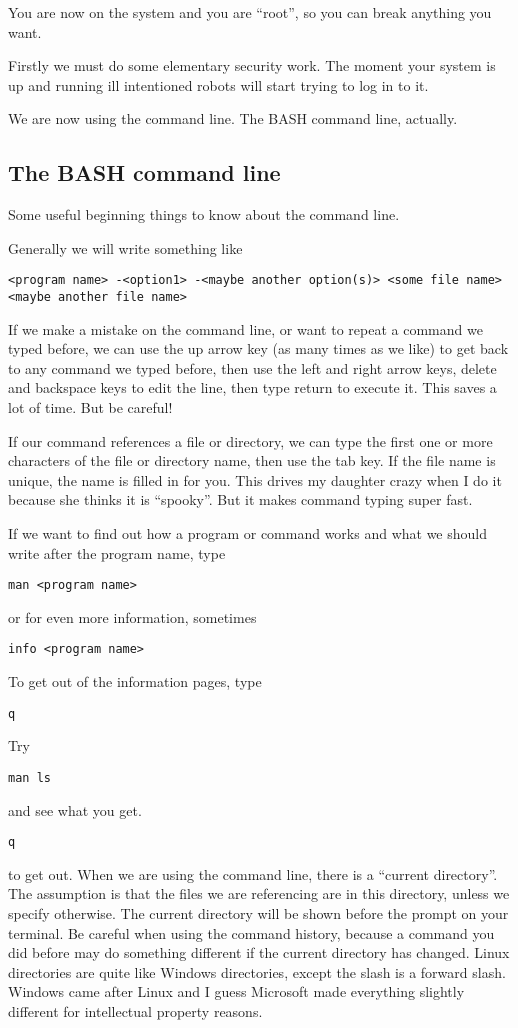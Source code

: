 \documentclass[12pt,a4paper]{article}
\begin{document}
You are now on the system and you are ``root'', so you can break anything you want.  

Firstly we must do some elementary security work. The moment your system is up and running ill intentioned robots will start trying to log in to it. 

We are now using the command line. The BASH command line, actually.

\subsection*{The BASH command line}
Some useful beginning things to know about the command line.

Generally we will write something like 
\begin{verbatim}
<program name> -<option1> -<maybe another option(s)> <some file name>  <maybe another file name>
\end{verbatim}


If we make a mistake on the command line, or want to repeat a command we typed before, we can use the up arrow key (as many times as we like) to get back to any command we typed before, then use the left and right arrow keys, delete and backspace keys to edit the line, then type return to execute it. This saves a lot of time. But be careful!

If our command references a file or directory, we can type the first one or more characters of the file or directory name, then use the tab key. If the file name is unique, the name is filled in for you. This drives my daughter crazy when I do it because she thinks it is “spooky”. But it makes command typing super fast.

If we want to find out how a program or command works and what we should write after the program name, type
\begin{verbatim}
man <program name>
\end{verbatim}
or for even more information, sometimes
\begin{verbatim}
info <program name>  
\end{verbatim}
To get out of the information pages, type 
\begin{verbatim}
q
\end{verbatim}
Try 
\begin{verbatim}
man ls
\end{verbatim}
and see what you get.
\begin{verbatim}
q 
\end{verbatim}
to get out.
When we are using the command line, there is a “current directory”. The assumption is that the files we are referencing are in this directory, unless we specify otherwise. The current directory will be shown before the prompt on your terminal. Be careful when using the command history, because a command you did before may do something different if the current directory has changed. Linux directories are quite like Windows directories, except the slash is a forward slash. Windows came after Linux and I guess Microsoft made everything slightly different for intellectual property reasons.
\end{document}

